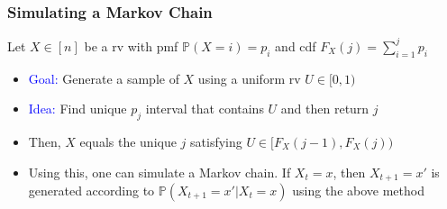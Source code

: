 \documentclass[10pt,english,aspectratio=169]{beamer}
\renewcommand{\Pr}{\mathbb{P}}
\begin{document}
\begin{frame} \frametitle{Simulating a Markov Chain}

Let $X \in [n]$ be a rv with pmf $\Pr (X=i) = p_i$ and cdf $F_X (j) = \sum_{i=1}^j p_i $
\vspace{4mm}

\begin{itemize}
\setlength{\itemsep}{2mm}
\item<2-> \textcolor{blue}{Goal:} Generate a sample of $X$ using a uniform rv $U \in [0,1)$
\end{itemize}

\vspace{-3mm}

\begin{itemize}
\setlength{\itemsep}{2mm}
\item<4-> \textcolor{blue}{Idea:} Find unique $p_j$ interval that contains $U$ and then return $j$

\item<5-> Then, $X$ equals the unique $j$ satisfying $U \in [F_X (j-1),F_X (j))$

\vspace{2mm}

\item<6-> Using this, one can simulate a Markov chain.  If $X_t = x$, then $X_{t+1} = x'$ is generated according to $\Pr(X_{t+1}=x'|X_t = x)$ using the above method
\end{itemize}

%
%
%


\end{frame}
\end{document}
